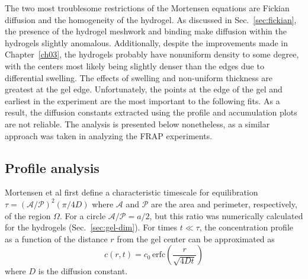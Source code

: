 The two most troublesome restrictions of the Mortensen equations are Fickian diffusion and the homogeneity of the hydrogel.  As discussed in Sec.~\ref{sec:fickian}, the presence of the hydrogel meshwork and binding make diffusion within the hydrogels slightly anomalous.  Additionally, despite the improvements made in Chapter~\ref{ch03}, the hydrogels probably have nonuniform density to some degree, with the centers most likely being slightly denser than the edges due to differential swelling.  The effects of swelling and non-uniform thickness are greatest at the gel edge.  Unfortunately, the points at the edge of the gel and earliest in the experiment are the most important to the following fits.  As a result, the diffusion constants extracted using the profile and accumulation plots are not reliable.  The analysis is presented below nonetheless, as a similar approach was taken in analyzing the FRAP experiments.

\subsection{Profile analysis}
\label{sec:profile-analysis}

Mortensen et al first define a characteristic timescale for equilibration $\tau = (\mathcal{A}/\mathcal{P})^2 (\pi/4D)$ where $\mathcal{A}$ and $\mathcal{P}$ are the area and perimeter, respectively, of the region $\Omega$.  For a circle $\mathcal{A}/\mathcal{P} = a/2$, but this ratio was numerically calculated for the hydrogels (Sec.~\ref{sec:gel-dim}).  For times $t \ll \tau$, the concentration profile as a function of the distance $r$ from the gel center can be approximated as 
\begin{equation}
c(r,t) = c_0 \,\mathrm{erfc}\left(\frac{r}{\sqrt{4Dt}}\right)
\label{eq:approx-profile}
\end{equation}
where $D$ is the diffusion constant.


